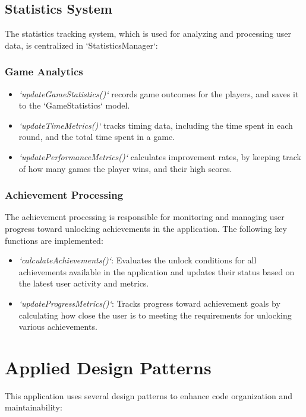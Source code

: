\subsection{Statistics System}
The statistics tracking system, which is used for analyzing and processing user data, is centralized in `StatisticsManager`:

\subsubsection{Game Analytics}
    \begin{itemize}
        \item \textit{`updateGameStatistics()`} records game outcomes for the players, and saves it to the `GameStatistics` model.
        \item \textit{`updateTimeMetrics()`} tracks timing data, including the time spent in each round, and the total time spent in a game.
        \item \textit{`updatePerformanceMetrics()`} calculates improvement rates, by keeping track of how many games the player wins, and their high scores.
    \end{itemize}

\subsubsection{Achievement Processing}
The achievement processing is responsible for monitoring and managing user progress toward unlocking achievements in the application. The following key functions are implemented:
    \begin{itemize}
        \item \textit{`calculateAchievements()`}: Evaluates the unlock conditions for all achievements available in the application and updates their status based on the latest user activity and metrics.
        \item \textit{`updateProgressMetrics()`}: Tracks progress toward achievement goals by calculating how close the user is to meeting the requirements for unlocking various achievements.
    \end{itemize}
    
\section{Applied Design Patterns}

This application uses several design patterns to enhance code organization and maintainability:

